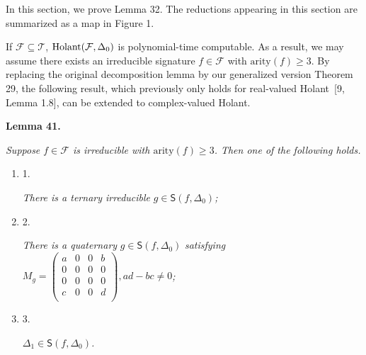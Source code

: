 In this section, we prove Lemma 32. The reductions appearing in this section are summarized as a map in Figure 1.\par




If $\mathcal{F}\subseteq\mathcal{T}$, $\textup{{Holant}}(\mathcal{F},\Delta_{0})$ is polynomial-time computable. As a result, we may assume there exists an irreducible signature $f\in\mathcal{F}$ with $\text{arity}(f)\geq 3$. By replacing the original decomposition lemma by our generalized version Theorem 29, the following result, which previously only holds for real-valued Holant [9, Lemma 1.8], can be extended to complex-valued Holant.\par





\par\medskip\noindent\textbf{
\textbf{Lemma 41}\textbf{.}
}\par



\emph{Suppose $f\in\mathcal{F}$ is irreducible with $\text{arity}(f)\geq 3$. Then one of the following holds.}\par


\begin{enumerate}


\item[] 
1. 


\emph{There is a ternary irreducible }$g\in\textsf{S}(f,\Delta_{0})$\emph{;}\par





\item[] 
2. 


\emph{There is a quaternary }$g\in\textsf{S}(f,\Delta_{0})$\emph{ satisfying }$M_{g}=\begin{pmatrix}a&0&0&b\\
0&0&0&0\\
0&0&0&0\\
c&0&0&d\\
\end{pmatrix},ad-bc\neq 0$\emph{;}\par





\item[] 
3. 


$\Delta_{1}\in\textsf{S}(f,\Delta_{0})$\emph{.}\par





\end{enumerate}



